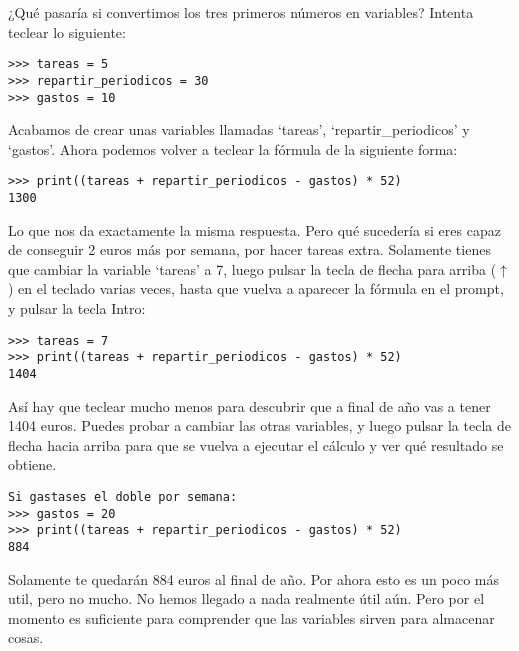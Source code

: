 \noindent
¿Qué pasaría si convertimos los tres primeros números en variables?  Intenta teclear lo siguiente:

\begin{listing}
\begin{verbatim}
>>> tareas = 5
>>> repartir_periodicos = 30
>>> gastos = 10
\end{verbatim}
\end{listing}

\noindent
Acabamos de crear unas variables llamadas `tareas', `repartir\_periodicos' y `gastos'. Ahora podemos volver a teclear la fórmula de la siguiente forma:

\begin{listing}
\begin{verbatim}
>>> print((tareas + repartir_periodicos - gastos) * 52)
1300
\end{verbatim}
\end{listing}

Lo que nos da exactamente la misma respuesta. Pero qué sucedería si eres capaz de conseguir 2 euros más por semana, por hacer tareas extra.  Solamente tienes que cambiar la variable `tareas' a 7, luego pulsar la tecla de flecha para arriba ($\uparrow$) en el teclado varias veces, hasta que vuelva a aparecer la fórmula en el prompt, y pulsar la tecla Intro:

\begin{listing}
\begin{verbatim}
>>> tareas = 7
>>> print((tareas + repartir_periodicos - gastos) * 52)
1404
\end{verbatim}
\end{listing}

Así hay que teclear mucho menos para descubrir que a final de año vas a tener 1404 euros. Puedes probar a cambiar las otras variables, y luego pulsar la tecla de flecha hacia arriba para que se vuelva a ejecutar el cálculo y ver qué resultado se obtiene.

\begin{listing}
\begin{verbatim}
Si gastases el doble por semana:
>>> gastos = 20
>>> print((tareas + repartir_periodicos - gastos) * 52)
884
\end{verbatim}
\end{listing}

Solamente te quedarán 884 euros al final de año. Por ahora esto es un poco más util, pero no mucho. No hemos llegado a nada realmente útil aún. Pero por el momento es suficiente para comprender que las variables sirven para almacenar cosas.

